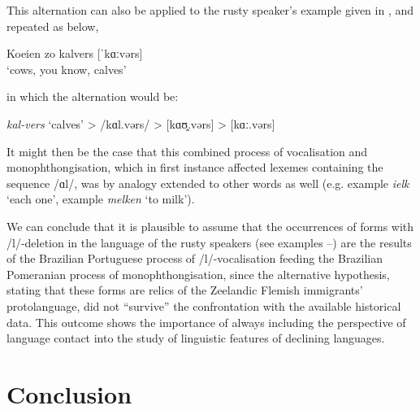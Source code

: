 \documentclass[output=paper,hidelinks,draftmode]{langscibook}
\begin{document}
This alternation can also be applied to the rusty speaker’s example given in , and repeated as  below,

\ea 
\label{ex:schaffel:29}
Koeien zo kalvers [ˈkɑːvərs] \\
\glt ‘cows, you know, calves’

in which the alternation would be: 

\textit{kal-vers} ‘calves’ > /{k}ɑl.vərs/ > {[k}ɑ{ʊ̯}.vərs{] > [k}ɑ{ː}.vərs{]}

\z 

\hspace*{-5pt}It might then be the case that this combined process of vocalisation and monophthongisation, which in first instance affected lexemes containing the sequence /ɑl/, was by analogy extended to other words as well (e.g. example  \textit{ielk} ‘each one’, example  \textit{melken} ‘to milk’).

We can conclude that it is plausible to assume that the occurrences of forms with /l/-deletion in the language of the rusty speakers (see examples --) are the results of the Brazilian Portuguese process of /l/-vocalisation feeding the Brazilian Pomeranian process of monophthongisation, since the alternative hypothesis, stating that these forms are relics of the Zeelandic Flemish immigrants’ protolanguage, did not ``survive'' the confrontation with the available historical data. This outcome shows the importance of always including the perspective of language contact into the study of linguistic features of declining languages.

\section{Conclusion}
\end{document}
